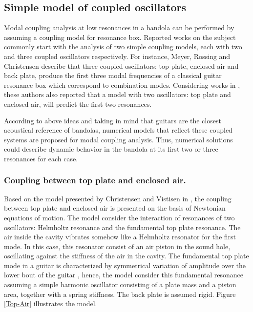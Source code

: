 \subsection{Simple model of coupled oscillators}

Modal coupling analysis at low resonances in a bandola can be performed by assuming a coupling model for resonance box. Reported works on the subject \cite{Rossing1, Meyer, Meyer2, Rossing, Rossing3, Christensen, Christensen3, Caldersmith1, Dickens1, Firth1} commonly start with the analysis of two  simple coupling models, each with two and three coupled oscillators respectively. For instance, Meyer, Rossing and Christensen \cite{Rossing1, Meyer, Christensen3} describe that three coupled oscillators: top plate, enclosed air and back plate, produce the first three modal frequencies of a classical guitar resonance box which correspond to combination modes. Considering works in \cite{Meyer2, Rossing3, Christensen}, these authors also reported that a model with two oscillators: top plate and enclosed air, will predict the first two resonances.

According to above ideas and taking in mind that guitars are the closest acoustical reference of bandolas, numerical models that reflect these coupled systems are proposed for modal coupling analysis. Thus, numerical solutions could describe dynamic behavior in the bandola at its first two or three resonances for each case.

\subsubsection{Coupling between top plate and enclosed air.}

Based on the model presented by Christensen and Vistisen in \cite{Christensen}, the coupling between top plate and enclosed air is presented on the basis of Newtonian equations of motion. The model consider the interaction of resonances of two oscillators: Helmholtz resonance and the fundamental top plate resonance. The air inside the cavity vibrates somehow like a Helmholtz resonator for the first mode. In this case, this resonator consist of an air piston in the sound hole, oscillating against the stiffness of the air in the cavity. The fundamental top plate mode in a guitar is characterized by symmetrical variation of amplitude over the lower bout of the guitar \cite{Jansson:GuitarModes}, hence, the model consider this fundamental resonance assuming a simple harmonic oscillator consisting of a plate mass and a piston area, together with a spring stiffness. The back plate is assumed rigid. Figure \ref{Top-Air} illustrates the model.

